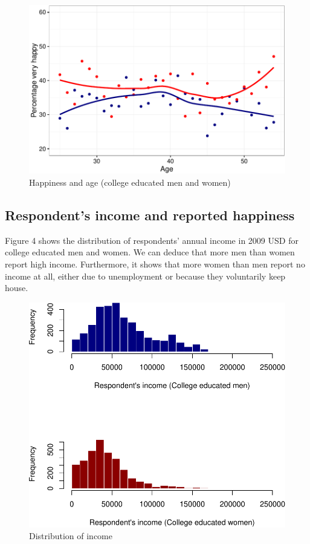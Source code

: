 \documentclass[]{article}
\begin{document}
\begin{figure}[htbp]
\centering
\includegraphics{Final_Project_P-P_analysis_Unger_files/figure-latex/unnamed-chunk-5-1.pdf}
\caption{Happiness and age (college educated men and women)}
\end{figure}

\subsection{Respondent's income and reported
happiness}\label{respondents-income-and-reported-happiness}

Figure 4 shows the distribution of respondents' annual income in 2009
USD for college educated men and women. We can deduce that more men than
women report high income. Furthermore, it shows that more women than men
report no income at all, either due to unemployment or because they
voluntarily keep house.

\begin{figure}[htbp]
\centering
\includegraphics{Final_Project_P-P_analysis_Unger_files/figure-latex/unnamed-chunk-6-1.pdf}
\caption{Distribution of income}
\end{figure}
\end{document}
